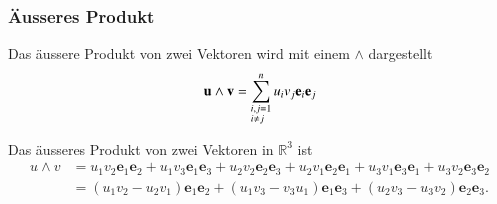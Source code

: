 \subsubsection{Äusseres Produkt}
Das äussere Produkt von zwei Vektoren wird mit einem $\wedge$ dargestellt
\begin{equation}
    \textbf{u}\wedge \textbf{v} 
    = 
    \sum_{\begin{subarray}{l}i,j=1\\i \neq j\end{subarray}}^n  u_iv_j\textbf{e}_i\textbf{e}_j 
\end{equation}
\begin{beispiel}
Das äusseres Produkt von zwei Vektoren in $\mathbb{R}^3$ ist
\begin{equation}
	\begin{split}
		u \wedge v 
		&= 
		u_1v_2\textbf{e}_1\textbf{e}_2 
		+ 
		u_1v_3\textbf{e}_1\textbf{e}_3 
		+ 
		u_2v_2\textbf{e}_2\textbf{e}_3 
		+ 
		u_2v_1\textbf{e}_2\textbf{e}_1 
		+ 
		u_3v_1\textbf{e}_3\textbf{e}_1 
		+
		u_3v_2\textbf{e}_3\textbf{e}_2 \\\ 
		&= 
		(u_1v_2 - u_2v_1)\textbf{e}_1\textbf{e}_2 
		+ 
		(u_1v_3 - v_3u_1)\textbf{e}_1\textbf{e}_3 
		+ 
		(u_2v_3 - u_3v_2)\textbf{e}_2\textbf{e}_3.
	\end{split}
\end{equation}
\end{beispiel}

